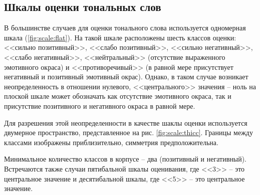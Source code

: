 \subsection{Шкалы оценки тональных слов}
В большинстве случаев для оценки тонального слова используется одномерная шкала (\ref{fig:scale:flat}).  
На такой шкале расположены шесть классов оценки: <<сильно позитивный>>, <<слабо позитивный>>, <<сильно негативный>>, <<слабо негативный>>, <<нейтральный>> (отсутствие выраженного эмотивного окраса) и <<противоречивый>> (в равной мере присутствует негативный и позитивный эмотивный окрас). Однако,  в таком случае возникает неопределенность в отношении нулевого, <<центрального>> значения -- ноль на плоской шкале может обозначать как отсутствие эмотивного окраса, так и присутствие позитивного и негативного окраса в равной мере.

Для разрешения этой неопределенности в качестве шаклы оценки используется двумерное пространство, представленное на рис. \ref{fig:scale:thicc}.  Границы между классами изображены приблизительно, симметрия предположительна.

Минимальное количество классов в корпусе -- два (позитивный и негативный). \cite{КотельниковЕ.2021} Встречаются также случаи пятибальной шкалы оценивания, где <<3>> -- это центральное значение и десятибальной шкалы, где <<5>> -- это центральное значение.

